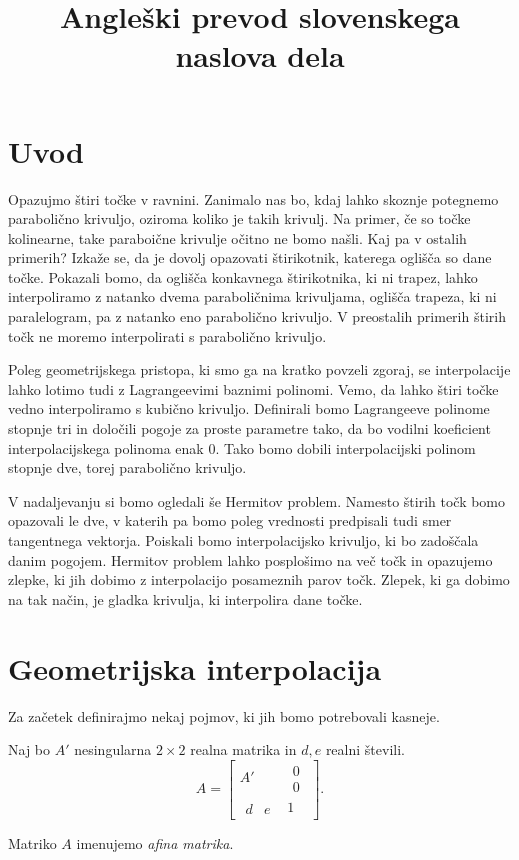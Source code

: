 \documentclass[mat1]{fmfdelo}
\title{Angleški prevod slovenskega naslova dela}
\begin{document}
\section{Uvod}

Opazujmo štiri točke v ravnini. Zanimalo nas bo, kdaj lahko skoznje potegnemo parabolično krivuljo, oziroma koliko je takih krivulj. Na primer, če so točke kolinearne, take paraboične krivulje očitno ne bomo našli. Kaj pa v ostalih primerih? Izkaže se, da je dovolj opazovati štirikotnik, katerega oglišča so dane točke. Pokazali bomo, da oglišča konkavnega štirikotnika, ki ni trapez, lahko interpoliramo z natanko dvema paraboličnima krivuljama, oglišča trapeza, ki ni paralelogram, pa z natanko eno parabolično krivuljo. V preostalih primerih štirih točk ne moremo interpolirati s parabolično krivuljo.

Poleg geometrijskega pristopa, ki smo ga na kratko povzeli zgoraj, se interpolacije lahko lotimo tudi z Lagrangeevimi baznimi polinomi. Vemo, da lahko štiri točke vedno interpoliramo s kubično krivuljo. Definirali bomo Lagrangeeve polinome stopnje tri in določili pogoje za proste parametre tako, da bo vodilni koeficient interpolacijskega polinoma enak $0$. Tako bomo dobili interpolacijski polinom stopnje dve, torej parabolično krivuljo.

V nadaljevanju si bomo ogledali še Hermitov problem. Namesto štirih točk bomo opazovali le dve, v katerih pa bomo poleg vrednosti predpisali tudi smer tangentnega vektorja. Poiskali bomo interpolacijsko krivuljo, ki bo zadoščala danim pogojem. Hermitov problem lahko posplošimo na več točk in opazujemo zlepke, ki jih dobimo z interpolacijo posameznih parov točk. Zlepek, ki ga dobimo na tak način, je gladka krivulja, ki interpolira dane točke. 

\section{Geometrijska interpolacija}

Za začetek definirajmo nekaj pojmov, ki jih bomo potrebovali kasneje.

\begin{definicija}
Naj bo $A'$ nesingularna $2\times2$ realna matrika in $d, e$ realni števili. 
$$ A = 
\begin{bmatrix}
A' &
\begin{matrix}
0 \\
0
\end{matrix}
\\
\begin{matrix}
d & e
\end{matrix}
 & 1
\end{bmatrix}
.$$

Matriko $A$ imenujemo \emph{afina matrika}. 
\end{definicija}
\end{document}
